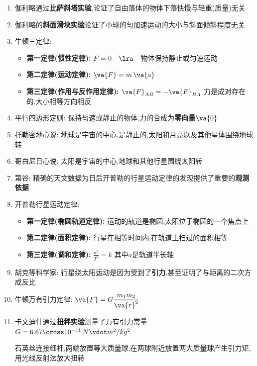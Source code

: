 \documentclass{article}
\begin{document}
\begin{enumerate}
    \item 伽利略通过\textbf{比萨斜塔实验},论证了自由落体的物体下落快慢与轻重(质量)无关
    \item 伽利略的\textbf{斜面滑块实验}论证了小球的匀加速运动的大小与斜面倾斜程度无关
    \item 牛顿三定律:
          \begin{itemize}
              \item \textbf{第一定律(惯性定律):} $ F = 0 \quad \lra \quad $物体保持静止或匀速运动
              \item \textbf{第二定律(运动定律):} $ \va{F} = m \, \va{a} $
              \item \textbf{第三定律(作用与反作用定律):} $ \va{F}_{AB} = - \va{F}_{BA} $ 力是成对存在的,大小相等方向相反
          \end{itemize}
    \item 平行四边形定则: 保持匀速或静止的物体,力的合成为\textbf{零向量$\va{0}$}
    \item 托勒密地心说: 地球是宇宙的中心,是静止的,太阳和月亮以及其他星体围绕地球转
    \item 哥白尼日心说: 太阳是宇宙的中心,地球和其他行星围绕太阳转
    \item 第谷: 精确的天文数据为日后开普勒的行星运动定律的发现提供了重要的\textbf{观测依据}
    \item 开普勒行星运动定律:
          \begin{itemize}
              \item \textbf{第一定律(椭圆轨道定律):} 运动的轨道是椭圆,太阳位于椭圆的一个焦点上
              \item \textbf{第二定律(面积定律):} 行星在相等时间内,在轨道上扫过的面积相等
              \item \textbf{第三定律(调和定律):} $ \frac{a^{3}}{T^{2}} = k $ 其中$a$是轨道半长轴
          \end{itemize}
    \item 胡克等科学家: 行星绕太阳运动是因为受到了\textbf{引力},甚至证明了与距离的二次方成反比
    \item 牛顿万有引力定律: $ \va{F} = G\dfrac{m_{1}m_{2}}{\va{r}^{2}}$
    \item 卡文迪什通过\textbf{扭秤实验}测量了万有引力常量$G = 6.67 \cross 10^{-11} \, N \vdot m^{2}/kg^{2} $

          \vspace{-1em}

          \hspace{-0.9em}\begin{adjustbox}{minipage=0.86\linewidth, bgcolor=gray!20, padding=1em}
              \small %
              石英丝连接细杆,两端放置等大质量球,在两球附近放置两大质量球产生引力矩,用光线反射法放大扭转


\end{adjustbox}
\end{enumerate}
\end{document}
